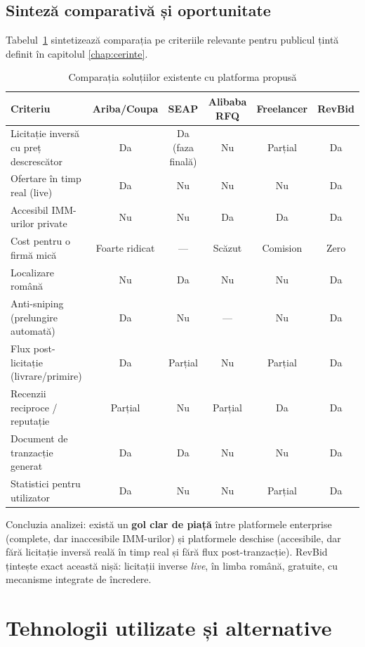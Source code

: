 \subsection{Sinteză comparativă și oportunitate}

Tabelul~\ref{tab:comparatie-piata} sintetizează comparația pe criteriile relevante pentru publicul țintă definit în capitolul \ref{chap:cerinte}.

\begin{table}[!ht]\footnotesize\linespread{1}
\centering
\caption{Comparația soluțiilor existente cu platforma propusă}
\label{tab:comparatie-piata}
\begin{tabular}{>{\raggedright\arraybackslash}p{3.6cm} c c c c c}
\toprule
\textbf{Criteriu} & \textbf{Ariba/Coupa} & \textbf{SEAP} & \textbf{Alibaba RFQ} & \textbf{Freelancer} & \textbf{RevBid} \\
\midrule
Licitație inversă cu preț descrescător & Da & Da (faza finală) & Nu & Parțial & Da \\
Ofertare în timp real (live) & Da & Nu & Nu & Nu & Da \\
Accesibil IMM-urilor private & Nu & Nu & Da & Da & Da \\
Cost pentru o firmă mică & Foarte ridicat & --- & Scăzut & Comision & Zero \\
Localizare română & Nu & Da & Nu & Nu & Da \\
Anti-sniping (prelungire automată) & Da & Nu & --- & Nu & Da \\
Flux post-licitație (livrare/primire) & Da & Parțial & Nu & Parțial & Da \\
Recenzii reciproce / reputație & Parțial & Nu & Parțial & Da & Da \\
Document de tranzacție generat & Da & Da & Nu & Nu & Da \\
Statistici pentru utilizator & Da & Nu & Nu & Parțial & Da \\
\bottomrule
\end{tabular}
\end{table}

Concluzia analizei: există un \textbf{gol clar de piață} între platformele enterprise (complete, dar inaccesibile IMM-urilor) și platformele deschise (accesibile, dar fără licitație inversă reală în timp real și fără flux post-tranzacție). RevBid țintește exact această nișă: licitații inverse \textit{live}, în limba română, gratuite, cu mecanisme integrate de încredere.

\section{Tehnologii utilizate și alternative}

